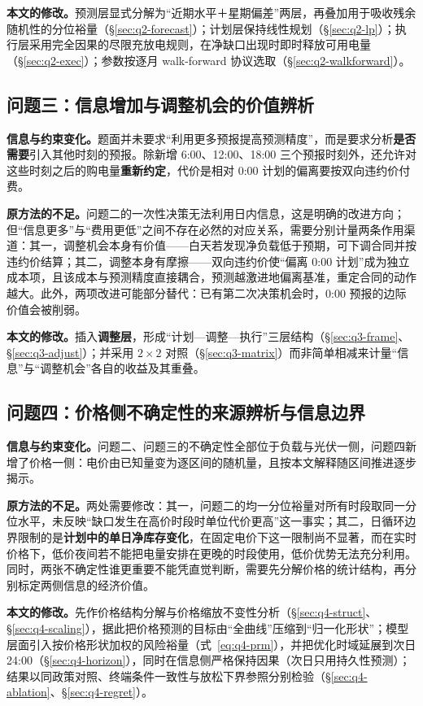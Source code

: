 \textbf{本文的修改。}预测层显式分解为``近期水平＋星期偏差''两层，再叠加用于吸收残余随机性的分位裕量（\S\ref{sec:q2-forecast}）；计划层保持线性规划（\S\ref{sec:q2-lp}）；执行层采用完全因果的尽限充放电规则，在净缺口出现时即时释放可用电量（\S\ref{sec:q2-exec}）；参数按逐月 walk-forward 协议选取（\S\ref{sec:q2-walkforward}）。

\subsection{问题三：信息增加与调整机会的价值辨析}
\label{sec:q3-analysis}

\textbf{信息与约束变化。}题面并未要求``利用更多预报提高预测精度''，而是要求分析\textbf{是否需要}引入其他时刻的预报。除新增 6:00、12:00、18:00 三个预报时刻外，还允许对这些时刻之后的购电量\textbf{重新约定}，代价是相对 0:00 计划的偏离要按双向违约价付费。

\textbf{原方法的不足。}问题二的一次性决策无法利用日内信息，这是明确的改进方向；但``信息更多''与``费用更低''之间不存在必然的对应关系，需要分别计量两条作用渠道：其一，调整机会本身有价值——白天若发现净负载低于预期，可下调合同并按违约价结算；其二，调整本身有摩擦——双向违约价使``偏离 0:00 计划''成为独立成本项，且该成本与预测精度直接耦合，预测越激进地偏离基准，重定合同的动作越大。此外，两项改进可能部分替代：已有第二次决策机会时，0:00 预报的边际价值会被削弱。

\textbf{本文的修改。}插入\textbf{调整层}，形成``计划—调整—执行''三层结构（\S\ref{sec:q3-frame}、\S\ref{sec:q3-adjust}）；并采用 $2\times2$ 对照（\S\ref{sec:q3-matrix}）而非简单相减来计量``信息''与``调整机会''各自的收益及其重叠。

\subsection{问题四：价格侧不确定性的来源辨析与信息边界}
\label{sec:q4-analysis}

\textbf{信息与约束变化。}问题二、问题三的不确定性全部位于负载与光伏一侧，问题四新增了价格一侧：电价由已知量变为逐区间的随机量，且按本文解释随区间推进逐步揭示。

\textbf{原方法的不足。}两处需要修改：其一，问题二的均一分位裕量对所有时段取同一分位水平，未反映``缺口发生在高价时段时单位代价更高''这一事实；其二，日循环边界限制的是\textbf{计划中的单日净库存变化}，在固定电价下这一限制尚不显著，而在实时价格下，低价夜间若不能把电量安排在更晚的时段使用，低价优势无法充分利用。同时，两张不确定性谁更重要不能凭直觉判断，需要先分解价格的统计结构，再分别标定两侧信息的经济价值。

\textbf{本文的修改。}先作价格结构分解与价格缩放不变性分析（\S\ref{sec:q4-struct}、\S\ref{sec:q4-scaling}），据此把价格预测的目标由``全曲线''压缩到``归一化形状''；模型层面引入按价格形状加权的风险裕量（式~\eqref{eq:q4-prm}），并把优化时域延展到次日 24:00（\S\ref{sec:q4-horizon}），同时在信息侧严格保持因果（次日只用持久性预测）；结果以同政策对照、终端条件一致性与放松下界参照分别检验（\S\ref{sec:q4-ablation}、\S\ref{sec:q4-regret}）。
